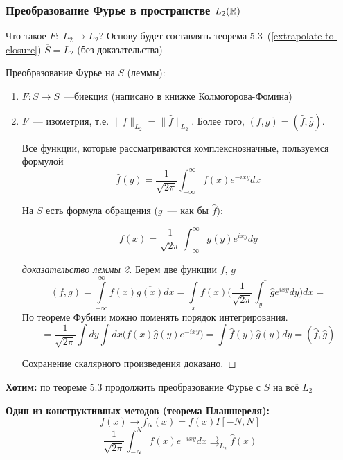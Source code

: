 \subsubsection{Преобразование Фурье в пространстве $L_2(\mathbb{R})$}

Что такое $F:\; L_2 \to L_2$? Основу будет составлять теорема 5.3~(\ref{extrapolate-to-closure})
$\overline{S}=L_2$ (без доказательства)

Преобразование Фурье на $S$ (леммы):
\begin{enumerate}
    \item $F:S \to S$~---биекция (написано в книжке Колмогорова-Фомина)
    \item $F$~--- изометрия, т.е. $\|f\|_{L_2} = \| \widehat{f}\|_{L_2}$. Более того, $(f,g)=(\widehat{f}, \widehat{g})$.
    \begin{note}
        Все функции, которые рассматриваются комплекснозначные, пользуемся формулой
        \[ \widehat{f}(y)=\frac{1}{\sqrt{2 \pi}} \int_{-\infty}^{\infty} f(x) e^{-ixy} dx \]

        На $S$ есть формула обращения ($g$~--- как бы $\widehat{f}$):

        \[ f(x)=\frac{1}{\sqrt{2 \pi}} \int_{-\infty}^{\infty} g(y)e^{ixy} dy \]
    \end{note}
    \begin{proof}[доказательство леммы 2]
    Берем две функции $f$, $g$
    \begin{equation*}
        (f,g) = \int\limits_{-\infty}^{\infty}f(x)\overline{g(x)}dx = \int\limits_{x}^{}f(x) \overline{\Big(\frac{1}{\sqrt{2 \pi}} \int_y \widehat{g} e^{i x y} dy\Big)}dx =
    \end{equation*}
    По теореме Фубини можно поменять порядок интегрирования.
    \begin{equation*}
        = \frac{1}{\sqrt{2 \pi}} \int dy \int dx \Big(f(x) \overline{\widehat{g}}(y)e^{-ixy}\Big)=\int \widehat{f}(y) \overline{\widehat{g}}(y) dy = (\widehat{f}, \widehat{g})
    \end{equation*}

    Сохранение скалярного произведения доказано.
\end{proof}
\end{enumerate}

\textbf{Хотим:} по теореме 5.3 продолжить преобразование Фурье с $S$ на всё $L_2$

\textbf{Один из конструктивных методов (теорема Планшереля):}
\[ f(x) \to f_N(x) = f(x) I[-N, N] \]
\[\frac{1}{\sqrt{2 \pi}} \int_{-N}^N f(x) e^{-ixy} dx \rightrightarrows_{L_2} \widehat{f}(x)\]


